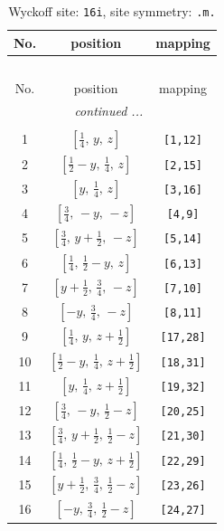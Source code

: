 \documentclass[fleqn,8pt]{jsarticle}
\begin{document}
\renewcommand{\arraystretch}{1.2}
\begin{longtable}{ccc}
\caption{Wyckoff site: {\tt 16i}, site symmetry: {\tt .m.}}
 \\
 \hline \hline
No. & position & mapping \\ \hline \endfirsthead

\multicolumn{2}{l}{\tablename\ \thetable{}} \\
 \hline \hline
No. & position & mapping \\ \hline \endhead

 \hline \hline
\multicolumn{2}{r}{\footnotesize\it continued ...} \\ \endfoot

 \hline \hline
\multicolumn{2}{r}{} \\ \endlastfoot

1 & $\left[ \frac{1}{4},\, y,\, z \right]$ & {\tt [1,12]} \\ \hline
2 & $\left[ \frac{1}{2} - y,\, \frac{1}{4},\, z \right]$ & {\tt [2,15]} \\ \hline
3 & $\left[ y,\, \frac{1}{4},\, z \right]$ & {\tt [3,16]} \\ \hline
4 & $\left[ \frac{3}{4},\, - y,\, - z \right]$ & {\tt [4,9]} \\ \hline
5 & $\left[ \frac{3}{4},\, y + \frac{1}{2},\, - z \right]$ & {\tt [5,14]} \\ \hline
6 & $\left[ \frac{1}{4},\, \frac{1}{2} - y,\, z \right]$ & {\tt [6,13]} \\ \hline
7 & $\left[ y + \frac{1}{2},\, \frac{3}{4},\, - z \right]$ & {\tt [7,10]} \\ \hline
8 & $\left[ - y,\, \frac{3}{4},\, - z \right]$ & {\tt [8,11]} \\ \hline
9 & $\left[ \frac{1}{4},\, y,\, z + \frac{1}{2} \right]$ & {\tt [17,28]} \\ \hline
10 & $\left[ \frac{1}{2} - y,\, \frac{1}{4},\, z + \frac{1}{2} \right]$ & {\tt [18,31]} \\ \hline
11 & $\left[ y,\, \frac{1}{4},\, z + \frac{1}{2} \right]$ & {\tt [19,32]} \\ \hline
12 & $\left[ \frac{3}{4},\, - y,\, \frac{1}{2} - z \right]$ & {\tt [20,25]} \\ \hline
13 & $\left[ \frac{3}{4},\, y + \frac{1}{2},\, \frac{1}{2} - z \right]$ & {\tt [21,30]} \\ \hline
14 & $\left[ \frac{1}{4},\, \frac{1}{2} - y,\, z + \frac{1}{2} \right]$ & {\tt [22,29]} \\ \hline
15 & $\left[ y + \frac{1}{2},\, \frac{3}{4},\, \frac{1}{2} - z \right]$ & {\tt [23,26]} \\ \hline
16 & $\left[ - y,\, \frac{3}{4},\, \frac{1}{2} - z \right]$ & {\tt [24,27]} \\
\end{longtable}
\end{document}
